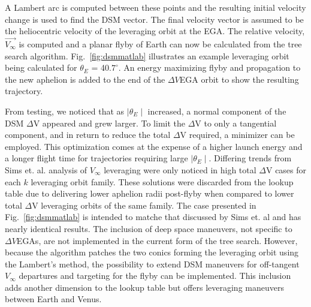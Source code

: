 \documentclass[letterpaper, preprint, paper,11pt]{AAS}	%
\begin{document}
A Lambert arc is computed between these points and the resulting initial velocity change is used to find the DSM vector. The final velocity vector is assumed to be the heliocentric velocity of the leveraging orbit at the EGA. The relative velocity, $\vec{V_\infty}$ is computed and a planar flyby of Earth can now be calculated from the tree search algorithm. Fig.~\ref{fig:dsmmatlab} illustrates an example leveraging orbit being calculated for $\theta_{E}$ = 40.$7^{\circ}$. An energy maximizing flyby and propagation to the new aphelion is added to the end of the $\Delta V$EGA orbit to show the resulting trajectory.

From testing, we noticed that as $\mid\theta_E\mid$ increased, a normal component of the DSM $\Delta$V appeared and grew larger. To limit the $\Delta$V to only a tangential component, and in return to reduce the total $\Delta$V required, a minimizer can be employed. This optimization comes at the expense of a higher launch energy and a longer flight time for trajectories requiring large $\mid\theta_E\mid$. Differing trends from Sims et. al. analysis of $V_\infty$ leveraging\cite{sims1994} were only noticed in high total $\Delta$V cases for each $k$ leveraging orbit family. These solutions were discarded from the lookup table due to delivering lower aphelion radii post-flyby when compared to lower total $\Delta$V leveraging orbits of the same family. The case presented in Fig.~\ref{fig:dsmmatlab} is intended to matche that discussed by Sims et. al\cite{Sims1997} and has nearly identical results. The inclusion of deep space maneuvers, not specific to $\Delta V$EGAs, are not implemented in the current form of the tree search. However, because the algorithm patches the two conics forming the leveraging orbit using the Lambert's method, the possibility to extend DSM maneuvers for off-tangent $V_\infty$ departures and targeting for the flyby can be implemented. This inclusion adds another dimension to the lookup table but offers leveraging maneuvers between Earth and Venus.
\end{document}
